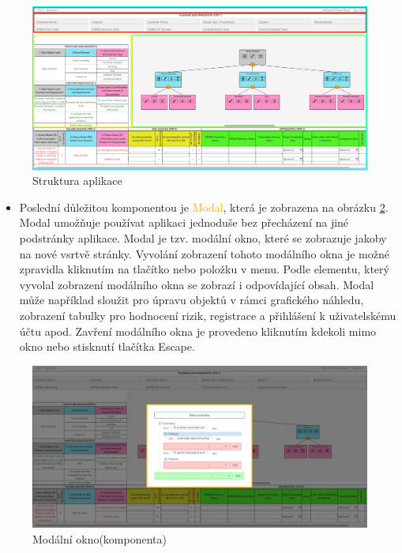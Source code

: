 \begin{figure}[t]
\centering
	\includegraphics[width=1.0\textwidth]{Figures/componentyP.png}
	\caption{Struktura aplikace}
	\label{fig:structure}
\end{figure}

\begin{itemize}
    \item Poslední důležitou komponentou je \textcolor{orange}{Modal}, která je zobrazena na obrázku \ref{fig:modal}. Modal umožňuje používat aplikaci jednoduše bez přecházení na jiné podstránky aplikace. Modal je tzv. modální okno, které se zobrazuje jakoby na nové vsrtvě stránky. Vyvolání zobrazení tohoto modálního okna je možné zpravidla kliknutím na tlačítko nebo položku v menu. Podle elementu, který vyvolal zobrazení modálního okna se zobrazí i odpovídající obsah. Modal může například sloužit pro úpravu objektů v rámci grafického náhledu, zobrazení tabulky pro hodnocení rizik, registrace a přihlášení k uživatelskému účtu apod. Zavření modálního okna je provedeno kliknutím kdekoli mimo okno nebo stisknutí tlačítka Escape. 
\end{itemize}
\begin{figure}[t]
\centering
	\includegraphics[width=1.0\textwidth]{Figures/modalP.png}
	\caption{Modální okno(komponenta)}
	\label{fig:modal}
\end{figure}

